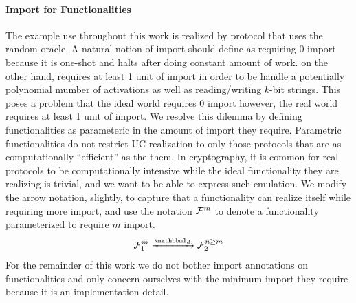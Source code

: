 \paragraph{Import for Functionalities}
The \Fcom example use throughout this work is realized by protocol that uses the random oracle. 
A natural notion of import should define \Fcom as requiring 0 import because it is one-shot and halts after doing constant amount of work.
\Fro on the other hand, requires at least 1 unit of import in order to be handle a potentially polynomial mumber of activations as well as reading/writing $k$-bit strings.
This poses a problem that the ideal world requires 0 import however, the real world requires at least 1 unit of import.
We resolve this dilemma by defining functionalities as parameteric in the amount of import they require.
Parametric functionalities do not restrict UC-realization to only those protocols that are as computationally ``efficient'' as the them. In cryptography, it is common for real protocols to be computationally intensive while the ideal functionality they are realizing is trivial, and we want to be able to express such emulation.
We modify the arrow notation, slightly, to capture that a functionality can realize itself while requiring more import, and use the notation $\mathcal{F}^m$ to denote a functionality parameterized to require $m$ import.
\[
	\F_1^m \xrightarrow{\idealP} \F_2^{n \geq m}
\]
For the remainder of this work we do not bother import annotations on functionalities and only concern ourselves with the minimum import they require because it is an implementation detail.


%

